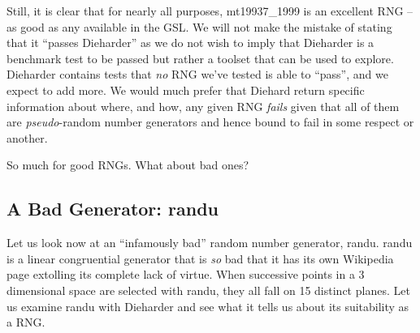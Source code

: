 \documentclass[12pt]{article}
\begin{document}
Still, it is clear that for nearly all purposes, mt19937\_1999 is an
excellent RNG -- as good as any available in the GSL.  We will not make
the mistake of stating that it ``passes Dieharder'' as we do not wish to
imply that Dieharder is a benchmark test to be passed but rather a
toolset that can be used to explore.  Dieharder contains tests that {\em
no} RNG we've tested is able to ``pass'', and we expect to add more.  We
would much prefer that Diehard return specific information about where,
and how, any given RNG {\em fails} given that all of them are {\em
pseudo}-random number generators and hence bound to fail in some respect
or another.

So much for good RNGs.  What about bad ones?

\subsection{A Bad Generator: randu}

Let us look now at an ``infamously bad'' random number generator, randu.
randu is a linear congruential generator that is {\em so} bad that it
has its own Wikipedia page\cite{wiki_randu} extolling its complete lack
of virtue.  When successive points in a 3 dimensional space are selected
with randu, they all fall on 15 distinct planes.  Let us examine randu
with Dieharder and see what it tells us about its suitability as a RNG.
\end{document}
